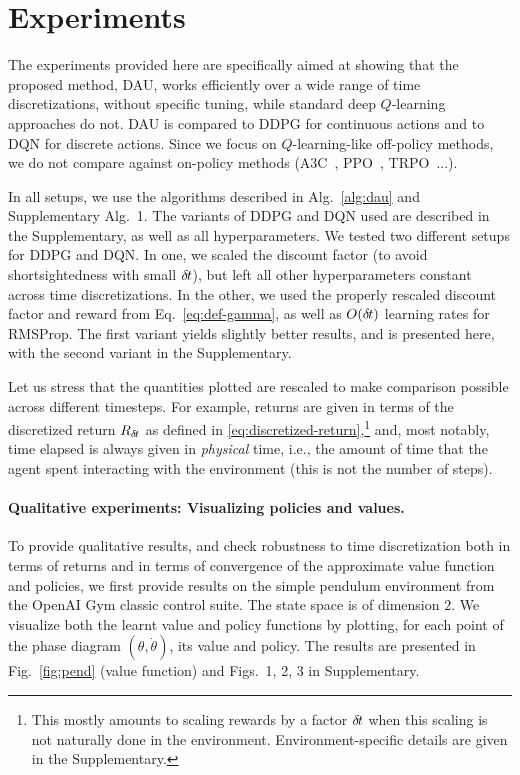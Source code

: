 \section{Experiments}
\label{sec:exp}

The experiments provided here are specifically aimed at showing that
the proposed method, DAU, works efficiently over a wide range of time
discretizations, without specific tuning, while standard deep $Q$-learning
approaches do not. DAU is compared to DDPG for continuous actions and to
DQN for
discrete actions.
Since we focus on $Q$-learning-like off-policy methods, we do not
compare against on-policy methods (A3C~\cite{a3c}, PPO~\cite{ppo},
TRPO~\cite{trpo}...).

In all setups, we use the algorithms described in
Alg.~\ref{alg:dau} and Supplementary Alg.~1. The variants of DDPG and DQN
used are described in the Supplementary, as well as all hyperparameters. We tested two different setups for DDPG and DQN.
In one, we scaled the discount factor (to avoid shortsightedness with small ${\delta\hspace{-.1em}t}$), but
left all other hyperparameters constant across time discretizations.
In the other, we used the properly rescaled discount
factor and reward from Eq.~\eqref{eq:def-gamma},
as well as $O({\delta\hspace{-.1em}t})$ learning rates for RMSProp.  The first variant yields slightly
better results, and is presented here, with the second variant in the
Supplementary.

Let us stress that the quantities plotted are rescaled to make comparison
possible across different timesteps. For example,
returns are given in terms of the discretized return $R_{\delta\hspace{-.1em}t}$ as defined in \eqref{eq:discretized-return},\footnote{This mostly amounts to scaling rewards
by a factor ${\delta\hspace{-.1em}t}$ when this scaling is not naturally done in the environment. Environment-specific
details are given in the Supplementary.} and, most notably, time elapsed is always given in
\emph{physical} time, i.e., the amount of time that the agent spent
interacting with the environment (this is not the number of steps).


\paragraph{Qualitative experiments: Visualizing policies and values.}
To provide qualitative results, and check robustness to time
discretization both in terms of returns and in terms
of convergence of the approximate value function and policies, we first provide results on the simple pendulum environment
from the OpenAI Gym classic control suite.  The state space is of
dimension $2$. We visualize both the learnt value and policy functions by
plotting, for each point of the phase diagram $(\theta, \dot{\theta})$,
its value and policy. The results are presented in
Fig.~\ref{fig:pend} (value function) and Figs.~1, 2,  3 in
Supplementary.

